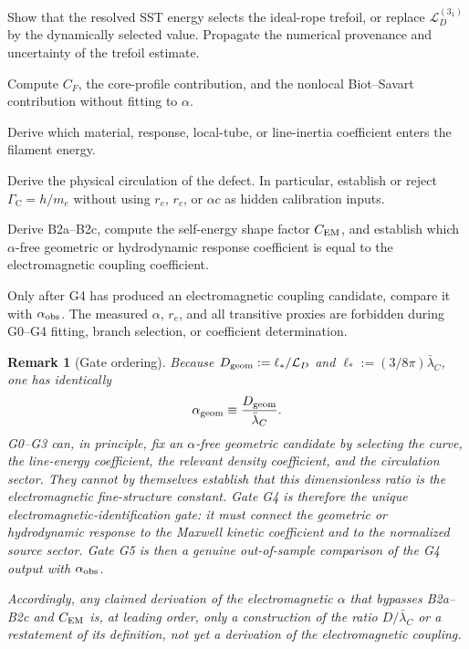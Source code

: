 \documentclass[aps,pre,preprint,notitlepage,nofootinbib,superscriptaddress]{revtex4-2}
\newcommand{\lC}{\bar\lambda_C}
\newcommand{\calL}{\mathcal L}
\newcommand{\GammaC}{\Gamma_{\mathrm C}}
\newtheorem{remark}{Remark}
\begin{document}
\begin{description}[leftmargin=2.3cm,style=nextline]
  \item[\textbf{G0: geometry and dynamics}]
  Show that the resolved SST energy selects the ideal-rope trefoil, or replace \(\calL_D^{(3_1)}\) by the dynamically selected value.  Propagate the numerical provenance and uncertainty of the trefoil estimate.

  \item[\textbf{G1: line energy}]
  Compute \(C_F\), the core-profile contribution, and the nonlocal Biot--Savart contribution without fitting to \(\alpha\).

  \item[\textbf{G2: density sector}]
  Derive which material, response, local-tube, or line-inertia coefficient enters the filament energy.

  \item[\textbf{G3: circulation}]
  Derive the physical circulation of the defect.  In particular, establish or reject \(\GammaC=h/m_e\) without using \(r_e\), \(r_c\), or \(\alpha c\) as hidden calibration inputs.

  \item[\textbf{G4: electromagnetic identification}]
  Derive B2a--B2c, compute the self-energy shape factor \(C_{\rm EM}\), and establish which \(\alpha\)-free geometric or hydrodynamic response coefficient is equal to the electromagnetic coupling coefficient.

  \item[\textbf{G5: out-of-sample comparison}]
  Only after G4 has produced an electromagnetic coupling candidate, compare it with \(\alpha_{\rm obs}\).  The measured \(\alpha\), \(r_e\), and all transitive proxies are forbidden during G0--G4 fitting, branch selection, or coefficient determination.
\end{description}

\begin{remark}[Gate ordering]
\label{rem:gate-ordering}
Because \(D_{\rm geom}:=\ell_*/\calL_D\) and
\(\ell_*:=(3/8\pi)\lC\), one has identically
\begin{equation}
  \alpha_{\rm geom}
  \equiv
  \frac{D_{\rm geom}}{\lC}.
  \label{eq:alpha-geom-definition}
\end{equation}
G0--G3 can, in principle, fix an \(\alpha\)-free geometric candidate by selecting the curve, the line-energy coefficient, the relevant density coefficient, and the circulation sector.  They cannot by themselves establish that this dimensionless ratio is the electromagnetic fine-structure constant.  Gate G4 is therefore the unique \emph{electromagnetic-identification gate}: it must connect the geometric or hydrodynamic response to the Maxwell kinetic coefficient and to the normalized source sector.  Gate G5 is then a genuine out-of-sample comparison of the G4 output with \(\alpha_{\rm obs}\).

Accordingly, any claimed derivation of the electromagnetic \(\alpha\) that bypasses B2a--B2c and \(C_{\rm EM}\) is, at leading order, only a construction of the ratio \(D/\lC\) or a restatement of its definition, not yet a derivation of the electromagnetic coupling.
\end{remark}
\end{document}
